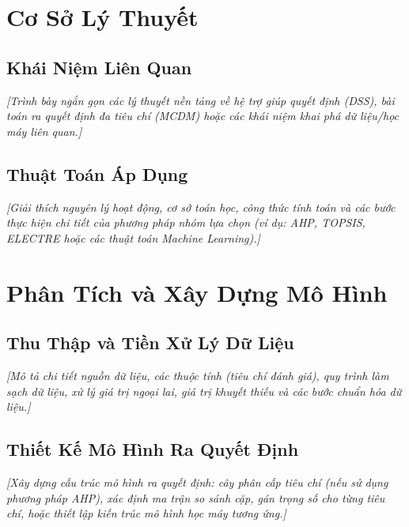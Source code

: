 \documentclass[12pt]{article}
\begin{document}
\section{Cơ Sở Lý Thuyết}

\subsection{Khái Niệm Liên Quan}
\textit{[Trình bày ngắn gọn các lý thuyết nền tảng về hệ trợ giúp quyết định (DSS), bài toán ra quyết định đa tiêu chí (MCDM) hoặc các khái niệm khai phá dữ liệu/học máy liên quan.]}

\subsection{Thuật Toán Áp Dụng}
\textit{[Giải thích nguyên lý hoạt động, cơ sở toán học, công thức tính toán và các bước thực hiện chi tiết của phương pháp nhóm lựa chọn (ví dụ: AHP, TOPSIS, ELECTRE hoặc các thuật toán Machine Learning).]}

\section{Phân Tích và Xây Dựng Mô Hình}

\subsection{Thu Thập và Tiền Xử Lý Dữ Liệu}
\textit{[Mô tả chi tiết nguồn dữ liệu, các thuộc tính (tiêu chí đánh giá), quy trình làm sạch dữ liệu, xử lý giá trị ngoại lai, giá trị khuyết thiếu và các bước chuẩn hóa dữ liệu.]}

\subsection{Thiết Kế Mô Hình Ra Quyết Định}
\textit{[Xây dựng cấu trúc mô hình ra quyết định: cây phân cấp tiêu chí (nếu sử dụng phương pháp AHP), xác định ma trận so sánh cặp, gán trọng số cho từng tiêu chí, hoặc thiết lập kiến trúc mô hình học máy tương ứng.]}

\end{document}
